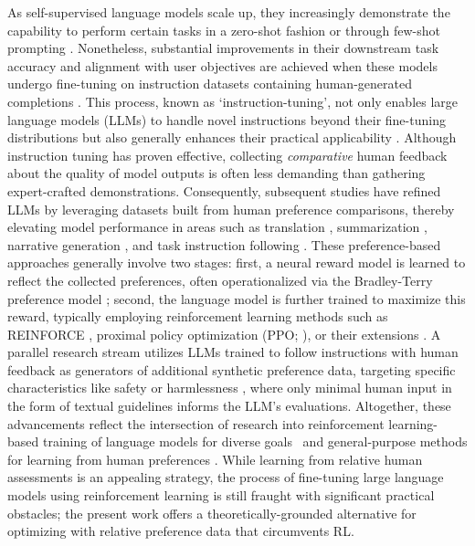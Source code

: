 As self-supervised language models scale up, they increasingly demonstrate the capability to perform certain tasks in a zero-shot fashion \citep{radford2019language} or through few-shot prompting \citep{gpt3,megatron,chowdhery2022palm}. Nonetheless, substantial improvements in their downstream task accuracy and alignment with user objectives are achieved when these models undergo fine-tuning on instruction datasets containing human-generated completions \citep{mishra-etal-2022-cross,sanh2022multitask,chung2022scaling,thoppilan2022lamda}. This process, known as `instruction-tuning', not only enables large language models (LLMs) to handle novel instructions beyond their fine-tuning distributions but also generally enhances their practical applicability \citep{chung2022scaling}. Although instruction tuning has proven effective, collecting \textit{comparative} human feedback about the quality of model outputs is often less demanding than gathering expert-crafted demonstrations. Consequently, subsequent studies have refined LLMs by leveraging datasets built from human preference comparisons, thereby elevating model performance in areas such as translation \citep{kreutzer-etal-2018-reliability}, summarization \citep{stiennon2022learning,ziegler2020finetuning}, narrative generation \citep{ziegler2020finetuning}, and task instruction following \citep{ouyang2022training,ramamurthy2023is}. These preference-based approaches generally involve two stages: first, a neural reward model is learned to reflect the collected preferences, often operationalized via the Bradley-Terry preference model \citep{bradley1952rankanalysis}; second, the language model is further trained to maximize this reward, typically employing reinforcement learning methods such as REINFORCE \citep{williams1992reinforce}, proximal policy optimization (PPO; \cite{schulman2017proximal}), or their extensions \citep{ramamurthy2023is}. A parallel research stream utilizes LLMs trained to follow instructions with human feedback as generators of additional synthetic preference data, targeting specific characteristics like safety or harmlessness \citep{bai2022constitutional}, where only minimal human input in the form of textual guidelines informs the LLM's evaluations. Altogether, these advancements reflect the intersection of research into reinforcement learning-based training of language models for diverse goals~\citep{Ranzato2015SequenceLT,paulus2018a,wu2018learning} and general-purpose methods for learning from human preferences \citep{christiano2017deep,kupcsik2018learning}. While learning from relative human assessments is an appealing strategy, the process of fine-tuning large language models using reinforcement learning is still fraught with significant practical obstacles; the present work offers a theoretically-grounded alternative for optimizing with relative preference data that circumvents RL.

